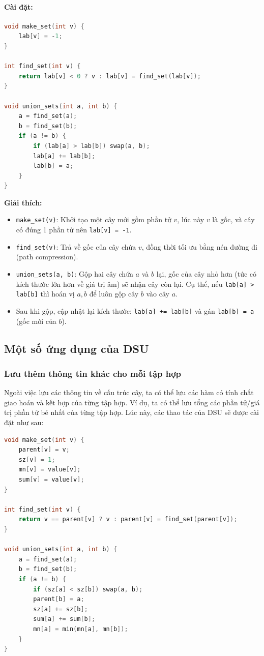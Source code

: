 \documentclass{article}
\begin{document}
\paragraph{Cài đặt:}
\begin{lstlisting}[language=C++]
void make_set(int v) {
    lab[v] = -1;
}

int find_set(int v) {
    return lab[v] < 0 ? v : lab[v] = find_set(lab[v]);
}

void union_sets(int a, int b) {
    a = find_set(a);
    b = find_set(b);
    if (a != b) {
        if (lab[a] > lab[b]) swap(a, b);
        lab[a] += lab[b];
        lab[b] = a;
    }
}
\end{lstlisting}

\textbf{Giải thích:}
\begin{itemize}
    \item \texttt{make\_set(v)}: Khởi tạo một cây mới gồm phần tử $v$, lúc này $v$ là gốc, và cây có đúng 1 phần tử nên \texttt{lab[v] = -1}.
    \item \texttt{find\_set(v)}: Trả về gốc của cây chứa $v$, đồng thời tối ưu bằng nén đường đi (path compression).
    \item \texttt{union\_sets(a, b)}: Gộp hai cây chứa $a$ và $b$ lại, gốc của cây nhỏ hơn (tức có kích thước lớn hơn về giá trị âm) sẽ nhận cây còn lại. Cụ thể, nếu \texttt{lab[a] > lab[b]} thì hoán vị $a, b$ để luôn gộp cây $b$ vào cây $a$.
    \item Sau khi gộp, cập nhật lại kích thước: \texttt{lab[a] += lab[b]} và gán \texttt{lab[b] = a} (gốc mới của $b$).
\end{itemize}

\subsection{Một số ứng dụng của DSU}

\subsubsection*{Lưu thêm thông tin khác cho mỗi tập hợp}

Ngoài việc lưu các thông tin về cấu trúc cây, ta có thể lưu các hàm có tính chất giao hoán và kết hợp của từng tập hợp. Ví dụ, ta có thể lưu tổng các phần tử/giá trị phần tử bé nhất của từng tập hợp. Lúc này, các thao tác của DSU sẽ được cài đặt như sau:

\begin{lstlisting}[language=C++]
void make_set(int v) {
    parent[v] = v;
    sz[v] = 1;
    mn[v] = value[v];
    sum[v] = value[v];
}

int find_set(int v) {
    return v == parent[v] ? v : parent[v] = find_set(parent[v]);
}

void union_sets(int a, int b) {
    a = find_set(a);
    b = find_set(b);
    if (a != b) {
        if (sz[a] < sz[b]) swap(a, b);
        parent[b] = a;
        sz[a] += sz[b];
        sum[a] += sum[b];
        mn[a] = min(mn[a], mn[b]);
    }
}
\end{lstlisting}
\end{document}
